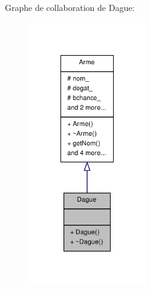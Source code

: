 Graphe de collaboration de Dague\-:
\nopagebreak
\begin{figure}[H]
\begin{center}
\leavevmode
\includegraphics[width=144pt]{class_dague__coll__graph}
\end{center}
\end{figure}
